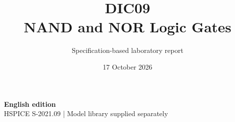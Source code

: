 \documentclass[11pt,a4paper]{article}
\title{\color{accent}DIC09\\[4pt]NAND and NOR Logic Gates}
\author{Specification-based laboratory report}
\date{17 October 2026}
\begin{document}
\maketitle
\begin{center}\small\textbf{English edition}\\
HSPICE S-2021.09 \quad | \quad Model library supplied separately
\end{center}


\end{document}
